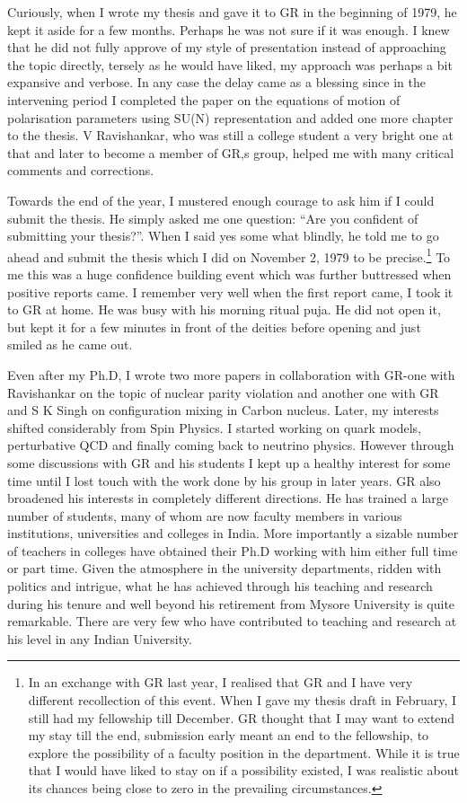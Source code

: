 Curiously, when I wrote my thesis and gave it to GR in the beginning of 1979, he kept it aside for a few months. Perhaps he was not sure if it was enough. I knew that he did not fully approve of my style of presentation instead of approaching the topic directly, tersely as he would have liked, my approach was perhaps a bit expansive and verbose. In any case the delay came as a blessing since in the intervening period I completed the paper on the equations of motion of polarisation parameters using SU(N) representation and added one more chapter to the thesis. V Ravishankar, who was still a college student a very bright one at that and later to become a member of GR,s group, helped me with many critical comments and corrections.

Towards the end of the year, I mustered enough courage to ask him if I could submit the thesis. He simply asked me one question: “Are you confident of submitting your thesis?”. When I said yes some what blindly, he told me to go ahead and submit the thesis which I did on November 2, 1979 to be precise.\footnote{In an exchange with GR last year, I realised that GR and I have very different recollection of this event. When I gave my thesis draft in February, I still had my fellowship till December. GR thought that I may want to extend my stay till the end, submission early meant an end to the fellowship, to explore the possibility of a faculty position in the department. While it is true that I would have liked to stay on if a possibility existed, I was realistic about its chances being close to zero in the prevailing circumstances.} To me this was a huge confidence building event which was further buttressed when positive reports came. I remember very well when the first report came, I took it to GR at home. He was busy with his morning ritual puja. He did not open it, but kept it for a few minutes in front of the deities before opening and just smiled as he came out. 

Even after my Ph.D, I wrote two more papers in collaboration with GR-one with Ravishankar on the topic of nuclear parity violation and another one with GR and S K Singh on configuration mixing in Carbon nucleus. Later, my interests shifted considerably from Spin Physics. I started working on quark models, perturbative QCD and finally coming back to neutrino physics. However through some discussions with GR and his students I kept up a healthy interest for some time until I lost touch with the work done by his group in later years. GR also broadened his interests in completely different directions. He has trained a large number of students, many of whom are now faculty members in various institutions, universities and colleges in India. More importantly a sizable number of teachers in colleges have obtained their Ph.D working with him either full time or part time. Given the atmosphere in the university departments, ridden with politics and intrigue, what he has achieved through his teaching and research during his tenure and well beyond his retirement from Mysore University is quite remarkable. There are very few who have contributed to teaching and research at his level in any Indian University.

